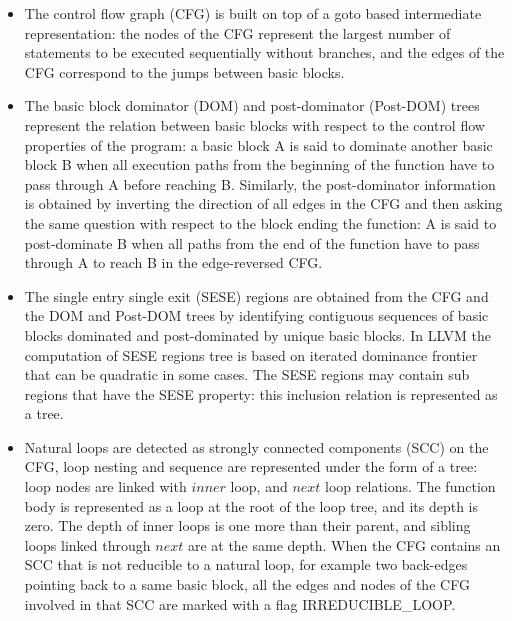 \documentclass{sig-alternate}
\begin{document}
\begin{itemize}
\item The control flow graph (CFG) \cite{dragonbook} is built on top of a goto
  based intermediate representation: the nodes of the CFG represent the largest
  number of statements to be executed sequentially without branches, and the
  edges of the CFG correspond to the jumps between basic blocks.

\item The basic block dominator (DOM) and post-dominator (Post-DOM) trees
  \cite{dragonbook, ramalingam} represent the relation between basic blocks with respect to
  the control flow properties of the program: a basic block A is said to
  dominate another basic block B when all execution paths from the beginning of
  the function have to pass through A before reaching B.  Similarly, the
  post-dominator information is obtained by inverting the direction of all edges
  in the CFG and then asking the same question with respect to the block ending
  the function: A is said to post-dominate B when all paths from the end of the
  function have to pass through A to reach B in the edge-reversed CFG.

\item The single entry single exit (SESE) regions \cite{sese} are obtained from
  the CFG and the DOM and Post-DOM trees by identifying contiguous sequences of
  basic blocks dominated and post-dominated by unique basic blocks.  In LLVM the
  computation of SESE regions tree is based on iterated dominance frontier
  \cite{ramalingam} that can be quadratic in some cases.  The SESE
  regions may contain sub regions that have the SESE property: this inclusion
  relation is represented as a tree.

\label{subsec:loop-tree}
\item Natural loops \cite{dragonbook, ramalingam} are detected as strongly connected
  components (SCC) \cite{tarjan} on the CFG, loop nesting and sequence are
  represented under the form of a tree: loop nodes are linked with $inner$ loop,
  and $next$ loop relations.  The function body is represented as a loop at the
  root of the loop tree, and its depth is zero.  The depth of inner loops is one
  more than their parent, and sibling loops linked through $next$ are at the
  same depth.  When the CFG contains an SCC that is not reducible to a natural
  loop, for example two back-edges pointing back to a same basic block, all the
  edges and nodes of the CFG involved in that SCC are marked with a flag
  IRREDUCIBLE\_LOOP.


\end{itemize}
\end{document}
